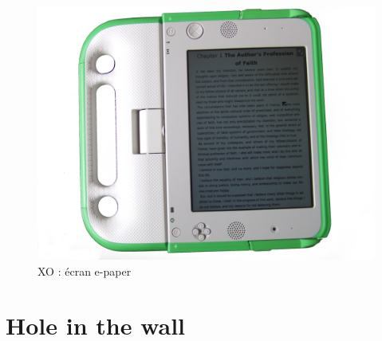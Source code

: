 \begin{minipage}{.5\linewidth}
  \begin{figure}[H]
    \includegraphics[width=\linewidth]{../resources/illustrations/olpc_display}
    \caption{XO : écran e-paper}
  \end{figure}
\end{minipage}

\section{Hole in the wall}

